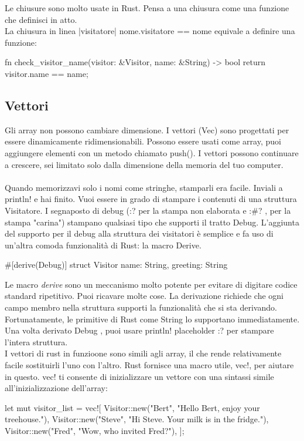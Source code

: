 \documentclass[11pt,a4paper]{article}
\begin{document}
\noindent Le chiusure sono molto usate in Rust. Pensa a una chiusura come una funzione che definisci in atto. \\
La chiusura in linea |visitatore| nome.visitatore == nome equivale a definire una funzione:
 \begin{rust}
fn check_visitor_name(visitor: &Visitor, name: &String) -> bool {
	return visitor.name == name;
}
\end{rust}

\subsection{Vettori}

Gli array non possono cambiare dimensione. I vettori ({\color{mauve}Vec}) sono progettati per essere dinamicamente ridimensionabili. Possono essere usati come array, puoi aggiungere elementi con un metodo chiamato {\color{RedTypename}push()}. I vettori possono continuare a crescere, sei limitato solo dalla dimensione della memoria del tuo computer.\\
\\
Quando memorizzavi solo i nomi come stringhe, stamparli era facile. Inviali a println! e hai finito. Vuoi essere in grado di stampare i contenuti di una struttura Visitatore. I segnaposto di debug ({:?} per la stampa non elaborata e {:\#?} , per la stampa "carina") stampano qualsiasi tipo che supporti il tratto Debug. L'aggiunta del supporto per il debug alla struttura dei visitatori è semplice e fa uso di un'altra comoda funzionalità di Rust: la macro {\color{mauve}Derive}.\\
\begin{rust}
#[derive(Debug)]
	struct Visitor {
		name: String,
		greeting: String
}
\end{rust}

Le macro \textit{derive} sono un meccanismo molto potente per evitare di digitare codice standard ripetitivo. Puoi ricavare molte cose. La derivazione richiede che ogni campo membro nella struttura supporti la funzionalità che si sta derivando. Fortunatamente, le primitive di Rust come String lo supportano immediatamente. Una volta derivato Debug , puoi usare println! placeholder {:?} per stampare l'intera struttura.\\
I vettori di rust in funzioone sono simili agli array, il che rende relativamente facile sostituirli l'uno con l'altro. Rust fornisce una macro utile, {\color{mauve}vec!}, per aiutare in questo. vec! ti consente di inizializzare un vettore con una sintassi simile all'inizializzazione dell'array:
\begin{rust}
let mut visitor_list = vec![
	Visitor::new("Bert", "Hello Bert, enjoy your treehouse."),
	Visitor::new("Steve", "Hi Steve. Your milk is in the fridge."),
	Visitor::new("Fred", "Wow, who invited Fred?"),
];
\end{rust}
\end{document}

